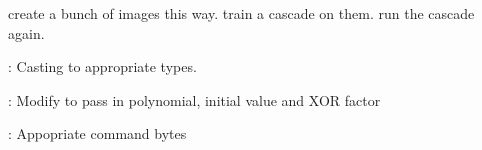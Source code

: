 \begin{DoxyRefList}
\item[\label{todo__todo000006}%
\Hypertarget{todo__todo000006}%
Member \hyperlink{classCamera_ab4f4c3f77479c8594dfa7fd7e6348306}{Camera\+:\+:take\+Scan\+For\+Green} ()]create a bunch of images this way. train a cascade on them. run the cascade again.  
\item[\label{todo__todo000001}%
\Hypertarget{todo__todo000001}%
Member \hyperlink{classController_a0a17902e4a70fde975c989c5275e8f05}{Controller\+:\+:Update\+Handler} (uint8\+\_\+t opcode, float value)]\+: Casting to appropriate types.  
\item[\label{todo__todo000009}%
\Hypertarget{todo__todo000009}%
Member \hyperlink{utils_8h_a382a50931a510e3f93461c289586dfd6}{C\+R\+C8} (uint8\+\_\+t $\ast$data, uint8\+\_\+t datalen)]\+: Modify to pass in polynomial, initial value and X\+OR factor  
\item[\label{todo__todo000007}%
\Hypertarget{todo__todo000007}%
Member \hyperlink{classI2CDriver_a732c5b799a0aecde0d908ee981872572}{I2\+C\+Driver\+:\+:Plain\+\_\+\+I2\+C\+\_\+\+Write\+\_\+\+Read\+\_\+\+C\+R\+C8} (int fd, uint16\+\_\+t command, uint16\+\_\+t $\ast$buffer, uint8\+\_\+t readlen, uint16\+\_\+t delay=10)]\+: Appopriate command bytes 
\end{DoxyRefList}